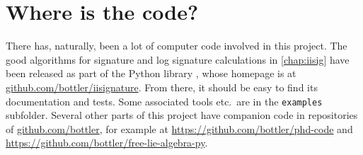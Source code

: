 \documentclass[11pt,a4paper]{report}      %
\begin{document}
\iffalse%
\section*{Notation}
When dealing with the tensor algebra and related concerns I often choose to adopt the notation of \cite{FLA}.

There are a couple competing claims for the use of the $\otimes$ symbol in a work such as this, because we are dealing with the tensor algebra. %
Besides when introducing the tensor algebra in 
the symbol $\otimes$ is never used to indicate the product, otherwise known as the concatenation product, within the tensor algebra. It generally means the external tensor product, which produces (elements of) tensor powers of the tensor algebra. This is consistent with \cite{FLA}. But our $\otimes$ is what \url{https://en.wikipedia.org/wiki/Tensor_algebra} calls $\boxtimes$.
\fi%

\section*{Where is the code?}
There has, naturally, been a lot of computer code involved in this project.
The good algorithms for signature and log signature calculations in \autoref{chap:iisig} have been released as part of the Python library \ii, whose homepage is at \url{github.com/bottler/iisignature}. 
From there, it should be easy to find its documentation and tests. Some associated tools etc.~are in the \verb|examples| subfolder.
Several other parts of this project have companion code in repositories of \url{github.com/bottler}, for example at \url{https://github.com/bottler/phd-code} and \url{https://github.com/bottler/free-lie-algebra-py}.
\end{document}
